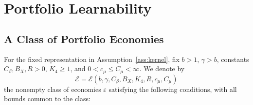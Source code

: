 \section{Portfolio Learnability}
\label{sec:portfolio_learnability}

\subsection{A Class of Portfolio Economies}
\label{sec:economy_class}

For the fixed representation in Assumption~\ref{ass:kernel}, fix $b>1$,
$\gamma>b$, constants $C_\beta,B_X,R>0$, $K_4\geq1$, and
$0<c_\mu\leq C_\mu<\infty$.
We denote by
\[
\mathcal E
=
\mathcal E(b,\gamma,C_\beta,B_X,K_4,R,c_\mu,C_\mu)
\]
the nonempty class of economies $\varepsilon$ satisfying the following
conditions, with all bounds common to the class:


